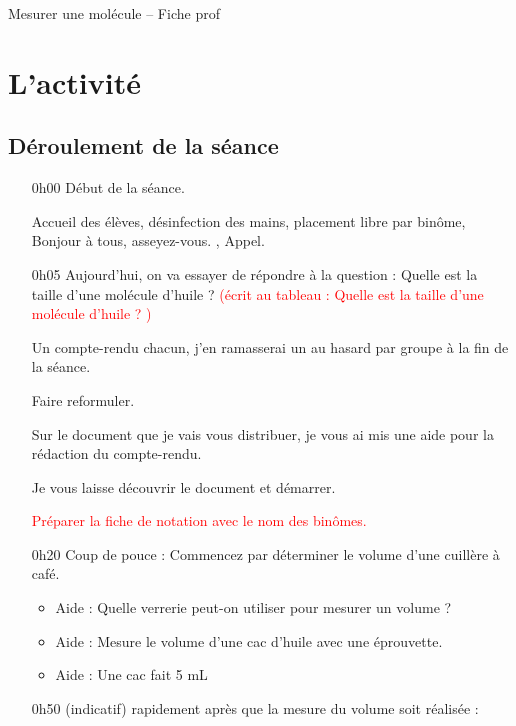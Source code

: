 \documentclass[12pt,a4paper]{article}
\begin{document}
\begin{header}
Mesurer une molécule -- Fiche prof
\end{header}

\section{L'activité}

\subsection{Déroulement de la séance}

\begin{itemize}
\item[0h00]
Début de la séance.

Accueil des élèves, désinfection des mains, placement libre par binôme, \og Bonjour à tous, asseyez-vous. \fg{}, Appel.

\item[0h05]
\og Aujourd'hui, on va essayer de répondre à la question : Quelle est la taille d'une molécule d'huile ? 
\textcolor{red}{(écrit au tableau : Quelle est la taille d'une molécule d'huile ? )}

\og Un compte-rendu chacun, j'en ramasserai un au hasard par groupe à la fin de la séance. \fg{}

Faire reformuler.

\og Sur le document que je vais vous distribuer, je vous ai mis une aide pour la rédaction du compte-rendu. \fg{} 

\og Je vous laisse découvrir le document et démarrer. \fg{}

\textcolor{red}{Préparer la fiche de notation avec le nom des binômes.}

\item[0h20]
Coup de pouce : \og Commencez par déterminer le volume d'une cuillère à café. \fg{}
\begin{itemize}
\item Aide : Quelle verrerie peut-on utiliser pour mesurer un volume ?

\item Aide : Mesure le volume d'une cac d'huile avec une éprouvette.

\item Aide : Une cac fait 5 mL
\end{itemize}

\item[0h50] (indicatif) rapidement après que la mesure du volume soit réalisée :


\end{itemize}
\end{document}
